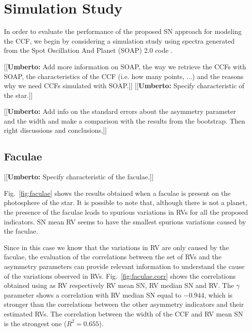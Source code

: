 \documentclass[11pt, oneside]{article}
\newcommand{\umberto}[1]{{\color{green}[[\textbf{Umberto: }#1]]}}
\begin{document}
\section{Simulation Study} \label{sec:soap}
In order to evaluate the performance of the proposed SN approach for modeling the CCF, we begin by considering a simulation study using spectra generated from the Spot Oscillation And Planet (SOAP) 2.0 code \citep{Dumusque-2014b}.

\umberto{Add more information on SOAP, the way we retrieve the CCFs with SOAP, the characteristics of the CCF (i.e. how many points, ...) and the reasons why we need CCFs simulated with SOAP.}
\umberto{Specify characteristic of the star.}

\umberto{Add info on the standard errors about the asymmetry parameter and the width and make a comparison with the results from the bootstrap. Then right discussions and conclusions,}

\subsection{Faculae} \label{sec:soap.faculae}

\umberto{Specify characteristic of the faculae.}

Fig.~\ref{fig:faculae} shows the results obtained when a faculae is present on the photosphere of the star. It is possible to note that, although there is not a planet, the presence of the faculae leads to spurious variations in RVs for all the proposed indicators. SN mean RV seems to have the smallest spurious variations caused by the faculae. %

Since in this case we know that the variations in RV are only caused by the faculae, the evaluation of the correlations between the set of RVs and the asymmetry parameters can provide relevant information to understand the cause of the variations observed in RVs. Fig.~\ref{fig:faculae.corr} shows the correlations obtained using as RV respectively RV mean SN, RV median SN and RV. The $\gamma$ parameter shows a correlation with RV median SN equal to $-0.944$, which is stronger than the correlations between the other asymmetry indicators and their estimated RVs. The correlation between the width of the CCF and RV mean SN is the strongest one ($R^{2}=0.655$).
\end{document}

